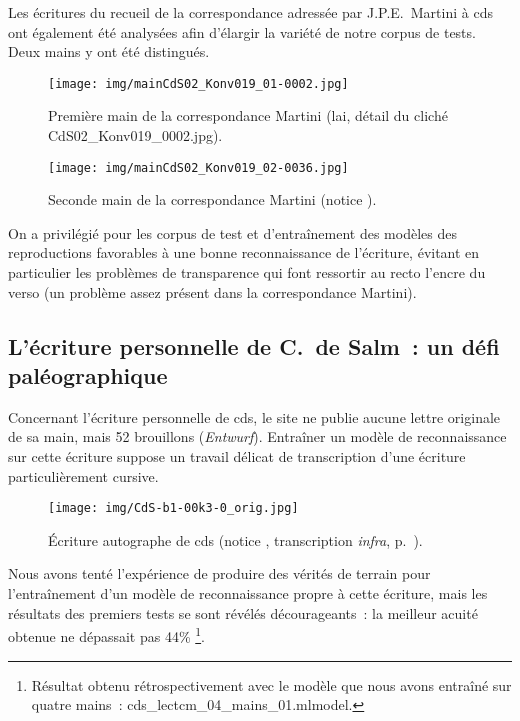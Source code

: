 \documentclass[a4paper,12pt,twoside]{book}
\begin{document}
				Les écritures du recueil de la correspondance adressée par J.P.E.~Martini à \gls{cds} ont également été analysées afin d'élargir la variété de notre corpus de tests. Deux mains y ont été distingués.
				
				\begin{figure}[!h]
					\centering
					\texttt{[image: img/mainCdS02\_Konv019\_01-0002.jpg]}
					\caption{Première main de la correspondance Martini (\gls{lai}, détail du cliché CdS02\_Konv019\_0002.jpg).}
					\label{}
				\end{figure}
				
				\begin{figure}[!h]
					\centering
					\texttt{[image: img/mainCdS02\_Konv019\_02-0036.jpg]}
					\caption{Seconde main de la correspondance Martini (notice \cite{CdS19036037}).}
					\label{}
				\end{figure}
					
				On a privilégié pour les corpus de test et d'entraînement des modèles des reproductions favorables à une bonne reconnaissance de l'écriture, évitant en particulier les problèmes de transparence qui font ressortir au recto l'encre du verso (un problème assez présent dans la correspondance Martini).

			\subsection{L'écriture personnelle de C.~de Salm~: un défi paléographique}
				Concernant l'écriture personnelle de \gls{cds}, le site ne publie aucune lettre originale de sa main, mais 52 brouillons (\textit{Entwurf}). Entraîner un modèle de reconnaissance sur cette écriture suppose un travail délicat de transcription d'une écriture particulièrement cursive.
				
				\begin{figure}[!h]
					\centering
					\texttt{[image: img/CdS-b1-00k3-0\_orig.jpg]}
					\caption{Écriture autographe de \gls{cds} (notice \cite{C11S92047049}, transcription \textit{infra}, p.~\pageref{trans-C11S92047049}).}
					\label{}
				\end{figure}
				
				Nous avons tenté l'expérience de produire des vérités de terrain pour l'entraînement d'un modèle de reconnaissance propre à cette écriture, mais les résultats des premiers tests se sont révélés décourageants~: la meilleur acuité obtenue ne dépassait pas 44\%
				\footnote{Résultat obtenu rétrospectivement avec le modèle que nous avons entraîné sur quatre mains~: cds\_lectcm\_04\_mains\_01.mlmodel.}.
				
\end{document}
